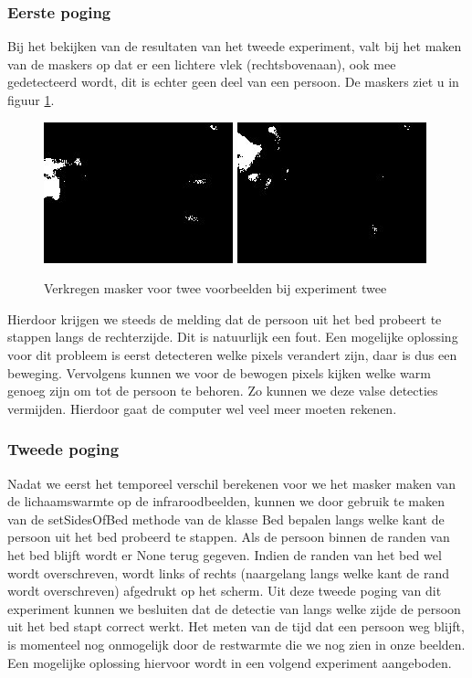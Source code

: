 \subsubsection{Eerste poging}
Bij het bekijken van de resultaten van het tweede experiment, valt bij het maken van de maskers op dat er een lichtere vlek (rechtsbovenaan), ook mee gedetecteerd wordt, dit is echter geen deel van een persoon. De maskers ziet u in figuur \ref{imgCDUB}.
\begin{figure}[h]
	\includegraphics[scale = 0.75]{MaskTweedeExperiment_img0}
	\includegraphics[scale = 0.75]{MaskTweedeExperiment_img4}
	\caption{Verkregen masker voor twee voorbeelden bij experiment twee}
	\label{imgCDUB}
\end{figure}
Hierdoor krijgen we steeds de melding dat de persoon uit het bed probeert te stappen langs de rechterzijde. Dit is natuurlijk een fout. Een mogelijke oplossing voor dit probleem is eerst detecteren welke pixels verandert zijn, daar is dus een beweging. Vervolgens kunnen we voor de bewogen pixels kijken welke warm genoeg zijn om tot de persoon te behoren. Zo kunnen we deze valse detecties vermijden. Hierdoor gaat de computer wel veel meer moeten rekenen.

\subsubsection{Tweede poging}
Nadat we eerst het temporeel verschil berekenen voor we het masker maken van de lichaamswarmte op de infraroodbeelden, kunnen we door gebruik te maken van de setSidesOfBed methode van de klasse Bed bepalen langs welke kant de persoon uit het bed probeerd te stappen. Als de persoon binnen de randen van het bed blijft wordt er None terug gegeven. Indien de randen van het bed wel wordt overschreven, wordt links of rechts (naargelang langs welke kant de rand wordt overschreven) afgedrukt op het scherm. Uit deze tweede poging van dit experiment kunnen we besluiten dat de detectie van langs welke zijde de persoon uit het bed stapt correct werkt. Het meten van de tijd dat een persoon weg blijft, is momenteel nog onmogelijk door de restwarmte die we nog zien in onze beelden. Een mogelijke oplossing hiervoor wordt in een volgend experiment aangeboden. 

